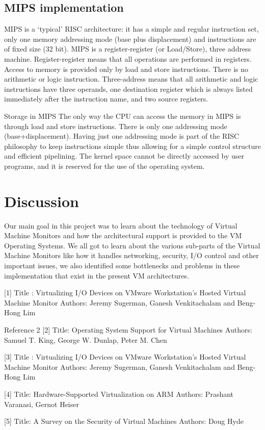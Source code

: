 \documentclass[runningheads]{llncs}
\begin{document}
\subsection{MIPS implementation}
MIPS is a ‘typical’ RISC architecture: it has a simple and regular instruction set, only one memory addressing mode (base plus displacement) and instructions are of fixed size (32 bit). MIPS is a register-register (or Load/Store), three address machine. Register-register means that all operations are performed in registers. Access to memory is provided only by load and store instructions. There is no arithmetic or logic instruction. Three-address means that all arithmetic and logic instructions have three operands, one destination register which is always listed immediately after the instruction name, and two source registers.\newline
 
Storage in MIPS
The only way the CPU can access the memory in MIPS is through load and store instructions. There is only one addressing mode (base+displacement). Having just one addressing mode is part of the RISC philosophy to keep instructions simple thus allowing for a simple control structure and efficient pipelining. The kernel space cannot be directly accessed by user programs, and it is reserved for the use of the operating system.

\section{Discussion}
Our main goal in this project was to learn about the technology of Virtual Machine Monitors and how the architectural support is provided to the VM Operating Systems. We all got to learn about the various sub-parts of the Virtual Machine Monitors like how it handles networking, security, I/O control and other important issues, we also identified some bottlenecks and problems in these implementation that exist in the present VM architectures.  





[1] Title : Virtualizing I/O Devices on VMware Workstation’s Hosted Virtual Machine Monitor
    Authors: Jeremy Sugerman, Ganesh Venkitachalam and Beng-Hong Lim

Reference 2
[2] Title: Operating System Support for Virtual Machines
    Authors: Samuel T. King, George W. Dunlap, Peter M. Chen

[3] Title : Virtualizing I/O Devices on VMware Workstation’s Hosted Virtual Machine Monitor
    Authors: Jeremy Sugerman, Ganesh Venkitachalam and Beng-Hong Lim

[4] Title: Hardware-Supported Virtualization on ARM
    Authors: Prashant Varanasi, Gernot Heiser

[5] Title: A Survey on the Security of Virtual Machines
    Authors: Doug Hyde
\end{document}
